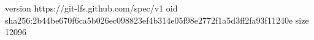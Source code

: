 version https://git-lfs.github.com/spec/v1
oid sha256:2b44be670f6ca5b026ec098823ef4b314e05f98e2772f1a5d3ff2fa93f11240e
size 12096
